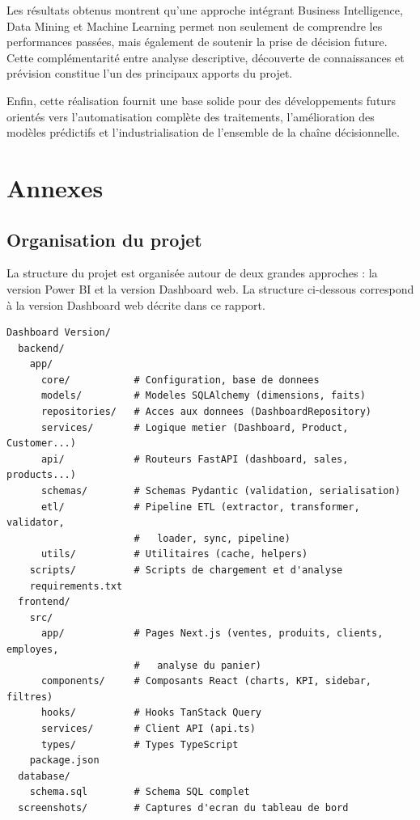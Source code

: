 \documentclass[12pt,a4paper,twoside]{report}
\begin{document}
Les résultats obtenus montrent qu'une approche intégrant Business Intelligence, Data Mining et Machine Learning permet non seulement de comprendre les performances passées, mais également de soutenir la prise de décision future. Cette complémentarité entre analyse descriptive, découverte de connaissances et prévision constitue l'un des principaux apports du projet.

Enfin, cette réalisation fournit une base solide pour des développements futurs orientés vers l'automatisation complète des traitements, l'amélioration des modèles prédictifs et l'industrialisation de l'ensemble de la chaîne décisionnelle.

\appendix

\chapter{Annexes}

\section{Organisation du projet}

La structure du projet est organisée autour de deux grandes approches : la version Power BI et la version Dashboard web. La structure ci-dessous correspond à la version Dashboard web décrite dans ce rapport.

\begin{lstlisting}[caption={Structure synthétique du projet -- Dashboard Version}]
Dashboard Version/
  backend/
    app/
      core/           # Configuration, base de donnees
      models/         # Modeles SQLAlchemy (dimensions, faits)
      repositories/   # Acces aux donnees (DashboardRepository)
      services/       # Logique metier (Dashboard, Product, Customer...)
      api/            # Routeurs FastAPI (dashboard, sales, products...)
      schemas/        # Schemas Pydantic (validation, serialisation)
      etl/            # Pipeline ETL (extractor, transformer, validator,
                      #   loader, sync, pipeline)
      utils/          # Utilitaires (cache, helpers)
    scripts/          # Scripts de chargement et d'analyse
    requirements.txt
  frontend/
    src/
      app/            # Pages Next.js (ventes, produits, clients, employes,
                      #   analyse du panier)
      components/     # Composants React (charts, KPI, sidebar, filtres)
      hooks/          # Hooks TanStack Query
      services/       # Client API (api.ts)
      types/          # Types TypeScript
    package.json
  database/
    schema.sql        # Schema SQL complet
  screenshots/        # Captures d'ecran du tableau de bord
\end{lstlisting}
\end{document}
